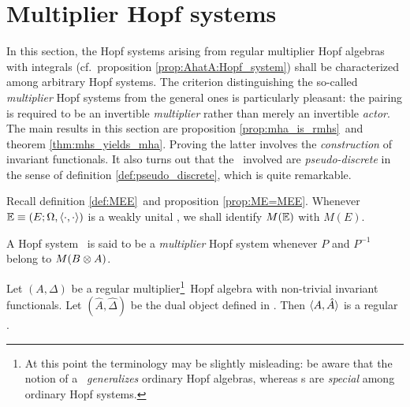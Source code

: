 \section{Multiplier Hopf systems}
\label{par:Multiplier_Hopf_systems}


\begin{abs_chp}
In this section, the Hopf systems arising from regular multiplier Hopf algebras
with integrals (cf.\ proposition \ref{prop:AhatA:Hopf_system}) shall be characterized
among arbitrary Hopf systems.
The criterion distinguishing the so-called {\em multiplier\/} Hopf systems from
the general ones is particularly pleasant: the pairing is required to be an
invertible {\em multiplier\/} rather than merely an invertible {\em actor}\@.
The main results in this section are proposition \ref{prop:mha_is_rmhs}\ and
theorem \ref{thm:mhs_yields_mha}\@. Proving the latter involves the {\em construction\/}
of invariant functionals.
It also turns out that the \contexts\ involved are {\em pseudo-discrete\/}
in the sense of definition \ref{def:pseudo_discrete}, which is quite remarkable.
\end{abs_chp}



Recall definition \ref{def:MEE}\ and proposition \ref{prop:ME=MEE}\@.
Whenever $\mathbb{E} \equiv (E; \Omega, \langle\cdot, \cdot\rangle)$ is a weakly unital \context, we shall identify $M(\mathbb{E})$ with $M(E)$.

\begin{defn_sec} \label{def:mhs}
A Hopf system \pairAB\ is said to be a {\em multiplier\/} Hopf system whenever
$P$ and $P^{-1}$ belong to $M(B \otimes A)$.
\end{defn_sec}


\begin{prop_sec} \label{prop:mha_is_rmhs}
Let\/ $(A,\Delta)$ be a regular multiplier\footnote{At this point the terminology
may be slightly misleading: be aware that the notion of a \mha\ {\em generalizes\/}
ordinary Hopf algebras, whereas \mhs s are {\em special\/} among ordinary Hopf systems.}\
Hopf algebra with non-trivial invariant functionals.
Let\/ $(\hat{A},\hat{\Delta})$ be the dual object defined in \cite{Fons:AFGD:proc,Fons:AFGD}\@.
Then $\langle A,\hat{A} \rangle$ is a regular \mhs.
\end{prop_sec}

